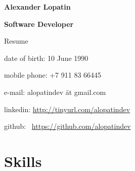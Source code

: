 \begin{center}
\fontsize{16pt}{12pt}\selectfont
\bfseries Alexander Lopatin\mdseries

\fontsize{12pt}{12pt}\selectfont
\bfseries Software Developer\mdseries

Resume
\end{center}
{
\fontsize{10pt}{8pt}\selectfont
\begin{center}
\item date of birth: 10 June 1990
\item mobile phone: +7 911 83 66445
\item e-mail: alopatindev ät gmail.com
\item linkedin: \href{http://tinyurl.com/alopatindev}{http://tinyurl.com/alopatindev}
\item github: \
\href{https://github.com/alopatindev?tab=repositories}{https://github.com/alopatindev}
\end{center}
}


\fontsize{11pt}{12pt}\selectfont

\section{Skills}

